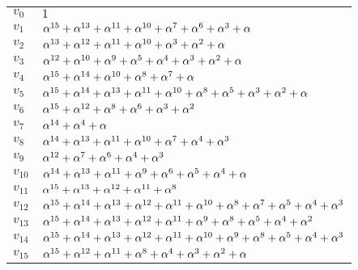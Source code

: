 \begin{center}
  \begin{tabular}{ll}
    & \\
    \hline
    $v_0$ & $1$\\
    $v_1$ & $\alpha^{15} + \alpha^{13} + \alpha^{11} + \alpha^{10} + \alpha^7
    + \alpha^6 + \alpha^3 + \alpha$\\
    $v_2$ & $\alpha^{13} + \alpha^{12} + \alpha^{11} + \alpha^{10} + \alpha^3
    + \alpha^2 + \alpha$\\
    $v_3$ & $\alpha^{12} + \alpha^{10} + \alpha^9 + \alpha^5 + \alpha^4 +
    \alpha^3 + \alpha^2 + \alpha$\\
    $v_4$ & $\alpha^{15} + \alpha^{14} + \alpha^{10} + \alpha^8 + \alpha^7 +
    \alpha$\\
    $v_5$ & $\alpha^{15} + \alpha^{14} + \alpha^{13} + \alpha^{11} +
    \alpha^{10} + \alpha^8 + \alpha^5 + \alpha^3 + \alpha^2 + \alpha$\\
    $v_6$ & $\alpha^{15} + \alpha^{12} + \alpha^8 + \alpha^6 + \alpha^3 +
    \alpha^2$\\
    $v_7$ & $\alpha^{14} + \alpha^4 + \alpha$\\
    $v_8$ & $\alpha^{14} + \alpha^{13} + \alpha^{11} + \alpha^{10} + \alpha^7
    + \alpha^4 + \alpha^3$\\
    $v_9$ & $\alpha^{12} + \alpha^7 + \alpha^6 + \alpha^4 + \alpha^3$\\
    $v_{10}$ & $\alpha^{14} + \alpha^{13} + \alpha^{11} + \alpha^9 + \alpha^6
    + \alpha^5 + \alpha^4 + \alpha$\\
    $v_{11}$ & $\alpha^{15} + \alpha^{13} + \alpha^{12} + \alpha^{11} + \alpha^8$\\
    $v_{12}$ & $\alpha^{15} + \alpha^{14} + \alpha^{13} + \alpha^{12} + \alpha^{11} + \alpha^{10} + \alpha^8 + \alpha^7 + \alpha^5 + \alpha^4 + \alpha^3$\\
    $v_{13}$ & $\alpha^{15} + \alpha^{14} + \alpha^{13} + \alpha^{12} +
    \alpha^{11} + \alpha^9 + \alpha^8 + \alpha^5 + \alpha^4 + \alpha^2$\\
    $v_{14}$ & $\alpha^{15} + \alpha^{14} + \alpha^{13} + \alpha^{12} +
    \alpha^{11} + \alpha^{10} + \alpha^9 + \alpha^8 + \alpha^5 + \alpha^4 +
    \alpha^3$\\
    $v_{15}$ & $\alpha^{15} + \alpha^{12} + \alpha^{11} + \alpha^8 + \alpha^4
    + \alpha^3 + \alpha^2 + \alpha$\\
    \hline
  \end{tabular}
\end{center}

